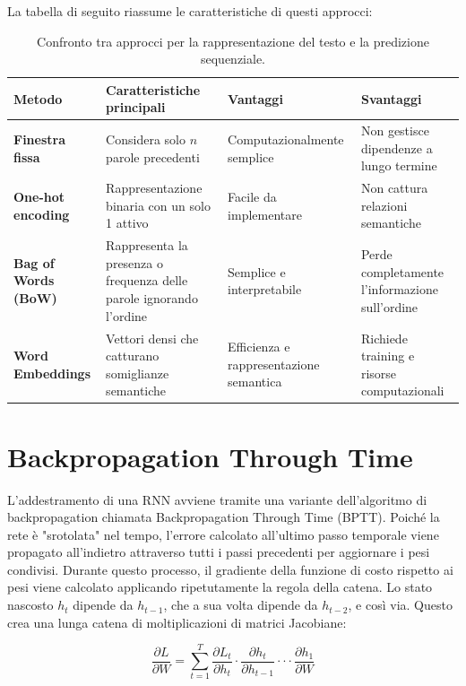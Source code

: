 La tabella di seguito riassume le caratteristiche di questi approcci:

\begin{table}[htbp]
\centering
\footnotesize
\caption{Confronto tra approcci per la rappresentazione del testo e la predizione sequenziale.}
\begin{adjustbox}{width=\textwidth}
\begin{tabular}{l|p{3.8cm}|p{3.5cm}|p{3.5cm}}
\hline
\textbf{Metodo} & \textbf{Caratteristiche principali} & \textbf{Vantaggi} & \textbf{Svantaggi} \\
\hline
\textbf{Finestra fissa} & Considera solo $n$ parole precedenti & Computazionalmente semplice & Non gestisce dipendenze a lungo termine \\
\hline
\textbf{One-hot encoding} & Rappresentazione binaria con un solo 1 attivo & Facile da implementare & Non cattura relazioni semantiche \\
\hline
\textbf{Bag of Words (BoW)} & Rappresenta la presenza o frequenza delle parole ignorando l’ordine & Semplice e interpretabile & Perde completamente l’informazione sull’ordine \\
\hline
\textbf{Word Embeddings} & Vettori densi che catturano somiglianze semantiche & Efficienza e rappresentazione semantica & Richiede training e risorse computazionali \\
\hline
\end{tabular}
\end{adjustbox}
\label{tab:metodi_sequenziali}
\end{table}

\section{Backpropagation Through Time}
L'addestramento di una RNN avviene tramite una variante dell'algoritmo di backpropagation chiamata Backpropagation Through Time (BPTT). Poiché la rete è "srotolata" nel tempo, l'errore calcolato all'ultimo passo temporale viene propagato all'indietro attraverso tutti i passi precedenti per aggiornare i pesi condivisi. Durante questo processo, il gradiente della funzione di costo rispetto ai pesi viene calcolato applicando ripetutamente la regola della catena. Lo stato nascosto $h_t$ dipende da $h_{t-1}$, che a sua volta dipende da $h_{t-2}$, e così via. Questo crea una lunga catena di moltiplicazioni di matrici Jacobiane:

\begin{equation}
    \frac{\partial L}{\partial W} = \sum_{t = 1}^T \frac{\partial L_t}{\partial h_t}\cdot\frac{\partial h_t}{\partial h_{t-1}}\cdot\cdot\cdot\frac{\partial h_1}{\partial W}
\end{equation}


